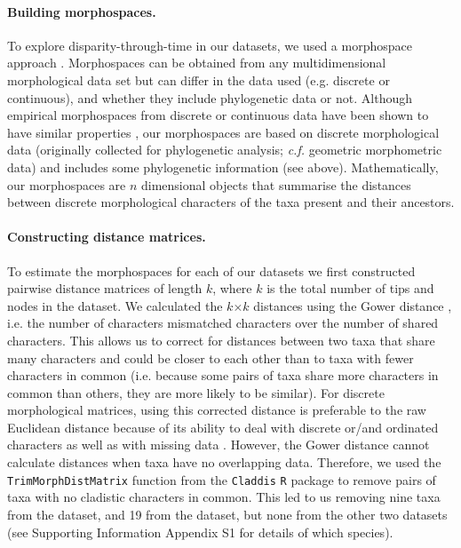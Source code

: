 \documentclass[12pt,a4paper]{article}
\begin{document}
\paragraph{Building morphospaces.} 
To explore disparity-through-time in our datasets, we used a morphospace approach \citep[e.g.][]{Foote01071994,Foote29111996,Wesley-Hunt2005,Brusatte12092008,friedmanexplosive2010,toljagictriassic-jurassic2013,Hughes20082013}.
Morphospaces can be obtained from any multidimensional morphological data set but can differ in the data used (e.g. discrete or continuous), and whether they include phylogenetic data or not.
Although empirical morphospaces from discrete or continuous data have been shown to have similar properties \citep{foth2012different,hetherington2015cladistic}, our morphospaces are based on discrete morphological data (originally collected for phylogenetic analysis; \textit{c.f.} geometric morphometric data) and includes some phylogenetic information (see above).
Mathematically, our morphospaces are $n$ dimensional objects that summarise the distances between discrete morphological characters of the taxa present and their ancestors.

\paragraph{Constructing distance matrices.}
To estimate the morphospaces for each of our datasets we first constructed pairwise distance matrices of length $k$, where $k$ is the total number of tips and nodes in the dataset.
We calculated the $k$$\times$$k$ distances using the Gower distance \citep{Gower71}, i.e. the number of characters mismatched characters over the number of shared characters.
This allows us to correct for distances between two taxa that share many characters and could be closer to each other than to taxa with fewer characters in common (i.e. because some pairs of taxa share more characters in common than others, they are more likely to be similar).
For discrete morphological matrices, using this corrected distance is preferable to the raw Euclidean distance because of its ability to deal with discrete or/and ordinated characters as well as with missing data \citep{anderson2012using}.
However, the Gower distance cannot calculate distances when taxa have no overlapping data.
Therefore, we used the \texttt{TrimMorphDistMatrix} function from the \texttt{Claddis} \texttt{R} package to remove pairs of taxa with no cladistic characters in common.
This led to us removing nine taxa from the \cite{bapst2016topology} dataset, and 19 from the \cite{brusatte2014gradual} dataset, but none from the other two datasets (see Supporting Information Appendix S1 for details of which species). 
\end{document}
